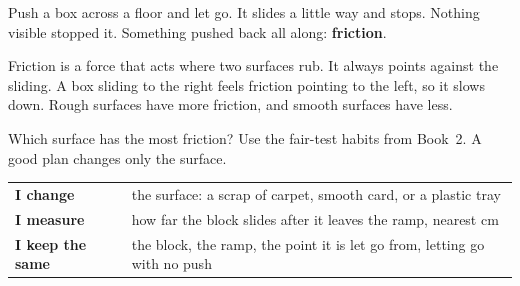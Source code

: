 \label{ch2}

Push a box across a floor and let go. It slides a little way and stops. Nothing visible stopped it. Something pushed back all along: \textbf{friction}.

Friction is a force that acts where two surfaces rub. It always points against the sliding. A box sliding to the right feels friction pointing to the left, so it slows down. Rough surfaces have more friction, and smooth surfaces have less.

\begin{center}
\end{center}

Which surface has the most friction? Use the fair-test habits from Book~2. A good plan changes only the surface.

\begin{center}
\sffamily\small\renewcommand{\arraystretch}{1.5}
\begin{tabular}{@{}p{3.4cm}p{7.6cm}@{}}
\toprule
\textbf{I change} & the surface: a scrap of carpet, smooth card, or a plastic tray\\
\textbf{I measure} & how far the block slides after it leaves the ramp, nearest cm\\
\textbf{I keep the same} & the block, the ramp, the point it is let go from, letting go with no push\\
\bottomrule
\end{tabular}
\end{center}


